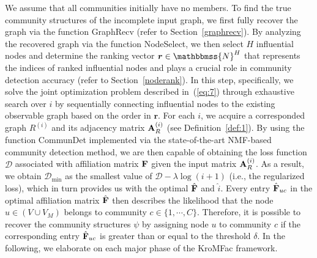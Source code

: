 \documentclass[format=acmsmall, review=false, screen=true]{acmart}
\def \log{\operatorname{log}}
\newcommand{\N}{\mathbbmss{N}}
\begin{document}
We assume that all communities initially have no members. To find the true community structures of the incomplete input graph, we first fully recover the graph via the function \textsf{GraphRecv} (refer to Section~\ref{graphrecv}). By analyzing the recovered graph via the function \textsf{NodeSelect}, we then select $H$ influential nodes and determine the ranking vector ${\bm r \in \N^H}$ that represents the indices of ranked influential nodes and plays a crucial role in community detection accuracy (refer to Section~\ref{noderank}). In this step, specifically, we solve the joint optimization problem described in~(\ref{eq:7}) through exhaustive search over $i$ by sequentially connecting influential nodes to the existing observable graph based on the order in ${\bm r}$. For each $i$, we acquire a corresponded graph $R^{(i)}$ and its adjacency matrix ${\bf A}^{(i)}_R$ (see Definition~\ref{def:1}). By using the function \textsf{CommunDet} implemented via the state-of-the-art NMF-based community detection method, we are then capable of obtaining the loss function $\mathcal{D}$ associated with affiliation matrix ${\bf F}$ given the input matrix ${\bf A}^{(i)}_R$. As a result, we obtain $\mathcal{D}_{\min}$ as the smallest value of $\mathcal{D}-\lambda\log(i+1)$ (i.e., the regularized loss), which in turn provides us with the optimal $\hat{{\bf F}}$ and $\hat{i}$. Every entry $\hat{{\bf F}}_{uc}$ in the optimal affiliation matrix $\hat{{\bf F}}$ then describes the likelihood that the node $u \in (V \cup V_M)$ belongs to community $c \in\{1,\cdots,C\}$. Therefore, it is possible to recover the community structures $\psi$ by assigning node $u$ to community $c$ if the corresponding entry $\hat{{\bf F}}_{uc}$ is greater than or equal to the threshold $\delta$. In the following, we elaborate on each major phase of the \textsf{KroMFac} framework.
\end{document}
